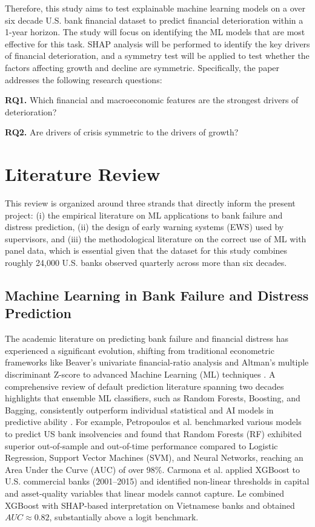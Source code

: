 \documentclass[conference]{IEEEtran}
\begin{document}
Therefore, this study aims to test explainable machine learning models on a over six decade U.S. bank financial dataset to predict financial deterioration within a 1-year horizon. The study will focus on identifying the ML models that are most effective for this task. SHAP analysis will be performed to identify the key drivers of financial deterioration, and a symmetry test will be applied to test whether the factors affecting growth and decline are symmetric. Specifically, the paper addresses the following research questions:

\textbf{RQ1.} Which financial and macroeconomic features are the strongest drivers of deterioration?

\textbf{RQ2.} Are drivers of crisis symmetric to the drivers of growth?

\section{Literature Review}
This review is organized around three strands that directly inform the present project: (i) the empirical literature on ML applications to bank failure and distress prediction, (ii) the design of early warning systems (EWS) used by supervisors, and (iii) the methodological literature on the correct use of ML with panel data, which is essential given that the dataset for this study combines roughly 24,000 U.S. banks observed quarterly across more than six decades.

\subsection{Machine Learning in Bank Failure and Distress Prediction}

The academic literature on predicting bank failure and financial distress has experienced a significant evolution, shifting from traditional econometric frameworks like Beaver's univariate financial-ratio analysis \cite{b6} and Altman's multiple discriminant Z-score \cite {b7} to advanced Machine Learning (ML) techniques \cite{b1}. A comprehensive review of default prediction literature spanning two decades highlights that ensemble ML classifiers, such as Random Forests, Boosting, and Bagging, consistently outperform individual statistical and AI models in predictive ability \cite{b1}. For example, Petropoulos et al. \cite{b4} benchmarked various models to predict US bank insolvencies and found that Random Forests (RF) exhibited superior out-of-sample and out-of-time performance compared to Logistic Regression, Support Vector Machines (SVM), and Neural Networks, reaching an Area Under the Curve (AUC) of over 98\%. Carmona et al. \cite{b8} applied XGBoost to U.S. commercial banks (2001–2015) and identified non-linear thresholds in capital and asset-quality variables that linear models cannot capture. Le \cite{b9} combined XGBoost with SHAP-based interpretation on Vietnamese banks and obtained $AUC \approx 0.82$, substantially above a logit benchmark.
\end{document}
